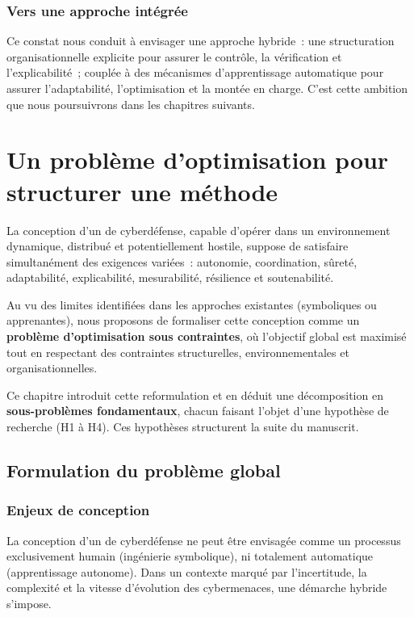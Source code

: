 \subsection*{Vers une approche intégrée}

Ce constat nous conduit à envisager une approche hybride~: une structuration organisationnelle explicite pour assurer le contrôle, la vérification et l'explicabilité~; couplée à des mécanismes d'apprentissage automatique pour assurer l'adaptabilité, l'optimisation et la montée en charge. C'est cette ambition que nous poursuivrons dans les chapitres suivants.


\clearpage
\thispagestyle{empty}
\null
\newpage

\chapter{Un problème d'optimisation pour structurer une méthode}
\label{chap:hypotheses}

La conception d’un  de cyberdéfense, capable d’opérer dans un environnement dynamique, distribué et potentiellement hostile, suppose de satisfaire simultanément des exigences variées~: autonomie, coordination, sûreté, adaptabilité, explicabilité, mesurabilité, résilience et soutenabilité.

Au vu des limites identifiées dans les approches existantes (symboliques ou apprenantes), nous proposons de formaliser cette conception comme un \textbf{problème d’optimisation sous contraintes}, où l’objectif global est maximisé tout en respectant des contraintes structurelles, environnementales et organisationnelles.

Ce chapitre introduit cette reformulation et en déduit une décomposition en \textbf{sous-problèmes fondamentaux}, chacun faisant l’objet d’une hypothèse de recherche (H1 à H4). Ces hypothèses structurent la suite du manuscrit.

\section{Formulation du problème global}

\subsection{Enjeux de conception}

La conception d’un  de cyberdéfense ne peut être envisagée comme un processus exclusivement humain (ingénierie symbolique), ni totalement automatique (apprentissage autonome). Dans un contexte marqué par l’incertitude, la complexité et la vitesse d’évolution des cybermenaces, une démarche hybride s’impose.

